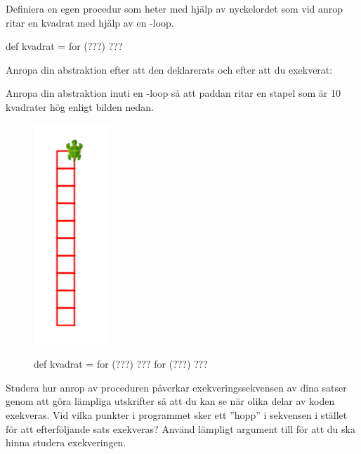 
\Subtask Definiera en egen procedur som heter  med hjälp av nyckelordet  som vid anrop ritar en kvadrat med hjälp av en -loop.

\begin{Code}
def kvadrat = for (???) {???}
\end{Code}


\Subtask Anropa din abstraktion efter att den deklarerats och efter att du exekverat:\\


\Subtask Anropa din abstraktion inuti en -loop så att paddan ritar en stapel som är 10 kvadrater hög enligt bilden nedan.

\begin{figure}
  \begin{multicols}{2}

  \includegraphics[scale=0.6]{../img/kojo/square-column}

  \columnbreak

  \begin{Code}
  def kvadrat = for (???) {???}
  for (???) {???}
  \end{Code}

  \end{multicols}
\end{figure}

\Subtask %
Studera hur anrop av proceduren  påverkar exekveringssekvensen av dina satser genom att göra lämpliga utskrifter så att du kan se när olika delar av koden exekveras. Vid vilka punkter i programmet sker ett ''hopp'' i sekvensen i stället för att efterföljande sats exekveras?  Använd lämpligt argument till  för att du ska hinna studera exekveringen.


